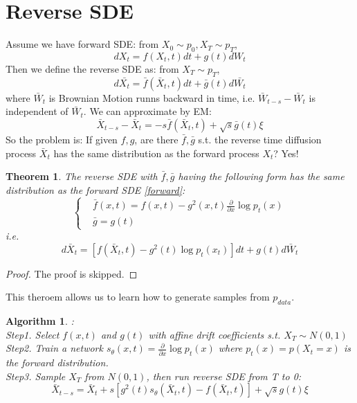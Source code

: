 \documentclass{article}
\newtheorem{theorem}{Theorem}
\newtheorem{proof}{Proof}
\newtheorem{algorithm}{Algorithm}
\begin{document}
\section{Reverse SDE}
Assume we have forward SDE: from $X_0\sim p_0,X_T\sim p_T$,
\begin{equation}\label{forward}
    dX_t = f(X_t, t)dt + g(t)dW_t
\end{equation}
Then we define the reverse SDE as: from $X_T\sim p_T$,
\begin{equation}
    d\bar{X_t}=\bar{f}(\bar{X}_t, t)dt + \bar{g}(t)d\bar{W_t}
\end{equation}
where $\bar{W}_t$ is Brownian Motion runns backward in time, i.e. $\bar{W}_{t-s}-\bar{W}_t$ is independent of $\bar{W}_t$. We can approximate by EM:
\begin{equation}
    \bar{X}_{t-s}-\bar{X}_t=-s\bar{f}(\bar{X}_t, t) + \sqrt{s}\bar{g}(t)\xi
\end{equation}
So the problem is: If given $f,g$, are there $\bar{f},\bar{g}$ s.t. the reverse time diffusion process $\bar{X}_t$ has the same distribution as the forward process $X_t$? Yes!
\begin{theorem}
    The reverse SDE with $\bar{f},\bar{g}$ having the following form has the same distribution as the forward SDE \ref{forward}:
    \begin{equation}\left\{
        \begin{aligned}
            &\bar{f}(x,t)=f(x,t)-g^2(x,t)\frac{\partial}{\partial x}\log p_t(x)\\
            &\bar{g}=g(t)
        \end{aligned}\right.
    \end{equation}
    i.e. 
    \begin{equation}
        d\bar{X}_t = \left[f(\bar{X}_t, t)-g^2(t)\log p_t(x_t)\right]dt+g(t)d\bar{W}_t
    \end{equation}
\end{theorem}
\begin{proof}
    The proof is skipped.
\end{proof}
This theroem allows us to learn how to generate samples from $p_{data}$.
\begin{algorithm}:\\
Step1. Select $f(x, t)$ and $g(t)$ with affine drift coefficients s.t. $X_T\sim N(0, 1)$\\
Step2. Train a network $s_\theta(x, t)=\frac{\partial}{\partial x}\log p_t(x)$ where $p_t(x)=p(X_t=x)$ is the forward distribution.\\
Step3. Sample $X_T$ from $N(0, 1)$, then run reverse SDE from T to 0:
\begin{equation}
    \bar{X}_{t-s} = \bar{X}_t + s\left[g^2(t)s_\theta(\bar{X}_t, t)-f(\bar{X}_t, t)\right] + \sqrt{s}g(t)\xi
\end{equation}
\end{algorithm}
\end{document}
